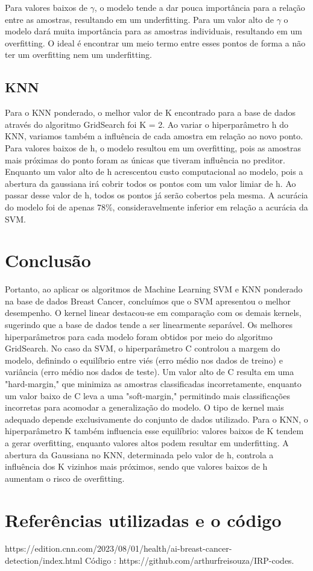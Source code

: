 \documentclass{article} %
\begin{document}
   Para valores baixos de \(\gamma\), o modelo tende a dar pouca importância para a relação entre as amostras, resultando em um underfitting. Para um valor alto de \(\gamma\) o modelo dará muita importância para as amostras individuais, resultando em um overfitting. O ideal é encontrar um meio termo entre esses pontos de forma a não ter um overfitting nem um underfitting.

   \subsection{KNN}

   \vspace{1cm}

   Para o KNN ponderado, o melhor valor de K encontrado para a base de dados através do algoritmo GridSearch foi K = 2. Ao variar o hiperparâmetro h do KNN, variamos também a influência de cada amostra em relação ao novo ponto. Para valores baixos de h, o modelo resultou em um overfitting, pois as amostras mais próximas do ponto foram as únicas que tiveram influência no preditor. Enquanto um valor alto de h acrescentou custo computacional ao modelo, pois a abertura da gaussiana irá cobrir todos os pontos com um valor limiar de h. Ao passar desse valor de h, todos os pontos já serão cobertos pela mesma. A acurácia do modelo foi de apenas 78\%, consideravelmente inferior em relação a acurácia da SVM.


   \section{Conclusão}

   Portanto, ao aplicar os algoritmos de Machine Learning SVM e KNN ponderado na base de dados Breast Cancer, concluímos que o SVM apresentou o melhor desempenho. O kernel linear destacou-se em comparação com os demais kernels, sugerindo que a base de dados tende a ser linearmente separável. Os melhores hiperparâmetros para cada modelo foram obtidos por meio do algoritmo GridSearch. No caso da SVM, o hiperparâmetro C controlou a margem do modelo, definindo o equilíbrio entre viés (erro médio nos dados de treino) e variância (erro médio nos dados de teste). Um valor alto de C resulta em uma "hard-margin," que minimiza as amostras classificadas incorretamente, enquanto um valor baixo de C leva a uma "soft-margin," permitindo mais classificações incorretas para acomodar a generalização do modelo. O tipo de kernel mais adequado depende exclusivamente do conjunto de dados utilizado. Para o KNN, o hiperparâmetro K também influencia esse equilíbrio: valores baixos de K tendem a gerar overfitting, enquanto valores altos podem resultar em underfitting. A abertura da Gaussiana no KNN, determinada pelo valor de h, controla a influência dos K vizinhos mais próximos, sendo que valores baixos de h aumentam o risco de overfitting.
   
   \section{Referências utilizadas e o código}

   https://edition.cnn.com/2023/08/01/health/ai-breast-cancer-detection/index.html
   Código : https://github.com/arthurfreisouza/IRP-codes.

   
\end{document}
